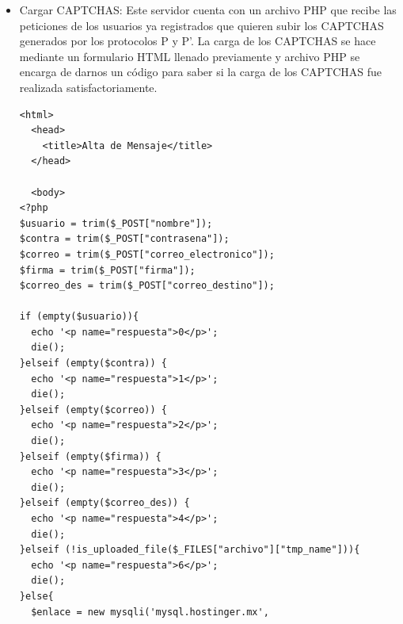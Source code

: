 \documentclass[12pt,oneside,onecolumn,openany]{report}
\begin{document}
\begin{itemize}
\begin{lstlisting}[frame=single]
	<body>
<?php
$usuario = trim($_POST["nombre"]);
$contra = trim($_POST["contrasena"]);
$correo = trim($_POST["correo_electronico"]);
if (empty($usuario)){
	echo '<p name="respuesta">0</p>';
}elseif (empty($contra)) {
	echo '<p name="respuesta">1</p>';
}elseif (empty($correo)) {
 \end{lstlisting}
 \begin{lstlisting}[frame=single]
	echo '<p name="respuesta">2</p>';
}else{
	$enlace = new mysqli('mysql.hostinger.mx', 
			'u715698692_corre', 
			'correocifrado',
			'u715698692_corre');
	if($enlace->connect_errno){
		echo '<p name="respuesta">3</p>';
		die("Error en conexion");
	}

	if (!file_exists("./Usuarios/".$correo)) {
		mkdir("./Usuarios/".$correo);
	}

	$query = "SELECT nombre FROM Usuario 
		WHERE correo_electronico like '$correo'";
	$result = $enlace->query($query);
	$aux = $result->num_rows;
	if($aux == 1){
		echo '<p name="respuesta">5</p>';
		$enlace->close();
	}else{
		$result->free();
		if($enlace->query("INSERT INTO `Usuario`
		(`correo_electronico`, `nombre`, `contrasena`) 
		VALUES 
		('".$correo."','".$usuario."','".$contra."')")
		=== TRUE){
			echo '<p name="respuesta">5</p>';
			$enlace->close();
		}else{
			echo '<p name="respuesta">6</p>';
			$enlace->close();
		}
	}
}
?>
	</body>
</html>
 \end{lstlisting}
 \item Cargar CAPTCHAS: Este servidor cuenta con un archivo PHP que recibe las peticiones de los usuarios ya registrados que quieren subir los CAPTCHAS generados por los protocolos P y P’. La carga de los CAPTCHAS se hace mediante un formulario HTML llenado previamente y archivo PHP se encarga de darnos un código para saber si la carga de los CAPTCHAS fue realizada satisfactoriamente.\\
 \begin{lstlisting}[frame=single]
 <html>
  <head>
    <title>Alta de Mensaje</title> 
  </head>

  <body>
<?php
$usuario = trim($_POST["nombre"]);
$contra = trim($_POST["contrasena"]);
$correo = trim($_POST["correo_electronico"]);
$firma = trim($_POST["firma"]);
$correo_des = trim($_POST["correo_destino"]);

if (empty($usuario)){
  echo '<p name="respuesta">0</p>';
  die();
}elseif (empty($contra)) {
  echo '<p name="respuesta">1</p>';
  die();
}elseif (empty($correo)) {
  echo '<p name="respuesta">2</p>';
  die();
}elseif (empty($firma)) {
  echo '<p name="respuesta">3</p>';
  die();
}elseif (empty($correo_des)) {
  echo '<p name="respuesta">4</p>';
  die();
}elseif (!is_uploaded_file($_FILES["archivo"]["tmp_name"])){
  echo '<p name="respuesta">6</p>';
  die();
}else{
  $enlace = new mysqli('mysql.hostinger.mx',


\end{lstlisting}
\end{itemize}
\end{document}

